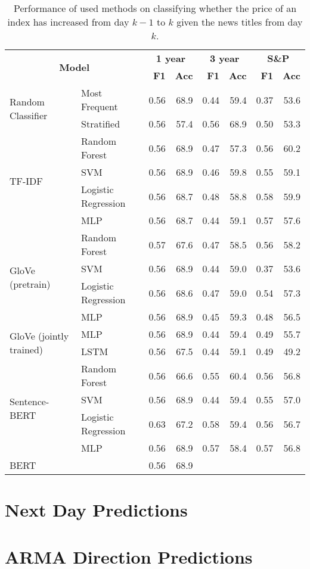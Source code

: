 \begin{table}[h]
    \centering
    \begin{tabular}{llrrrrrr}
    \hline
        \multicolumn{2}{c}{\multirow{2}{*}{\textbf{Model}}} & \multicolumn{2}{c}{\textbf{1 year}} & \multicolumn{2}{c}{\textbf{3 year}} & \multicolumn{2}{c}{\textbf{S\&P}} \\
      & & \textbf{F1} & \textbf{Acc} & \textbf{F1} & \textbf{Acc} & \textbf{F1} & \textbf{Acc} \\
        \hline \hline   
        \multirow{2}{*}{Random Classifier} & Most Frequent & 0.56 & 68.9 & 0.44 & 59.4 & 0.37 & 53.6 \\
        & Stratified & 0.56 & 57.4 & 0.56 & 68.9 & 0.50 & 53.3 \\
        \hline 
        \multirow{4}{*}{TF-IDF} & Random Forest & 0.56 & 68.9 & 0.47 & 57.3 & 0.56 & 60.2 \\
        & SVM & 0.56 & 68.9 & 0.46 & 59.8 & 0.55 & 59.1 \\
        & Logistic Regression & 0.56 & 68.7 & 0.48 & 58.8 & 0.58 & 59.9  \\
        & MLP & 0.56 & 68.7 & 0.44 & 59.1 & 0.57 & 57.6 \\
        \hline 
        \multirow{4}{*}{GloVe (pretrain)} & Random Forest & 0.57 & 67.6 & 0.47 & 58.5 & 0.56 & 58.2 \\
        & SVM & 0.56 & 68.9 & 0.44 & 59.0 & 0.37 & 53.6 \\
        & Logistic Regression & 0.56 & 68.6 & 0.47 & 59.0 & 0.54 & 57.3 \\
        & MLP & 0.56 & 68.9 & 0.45 & 59.3 & 0.48 & 56.5 \\
        \hline 
        \multirow{2}{*}{GloVe (jointly trained)} & MLP & 0.56 & 68.9 & 0.44 & 59.4 & 0.49 & 55.7 \\
        & LSTM & 0.56 & 67.5 & 0.44 & 59.1 & 0.49 & 49.2  \\
        \hline 
        \multirow{4}{*}{Sentence-BERT} & Random Forest & 0.56 & 66.6 & 0.55 & 60.4 & 0.56 & 56.8 \\
        & SVM & 0.56 & 68.9 & 0.44 & 59.4 & 0.55 & 57.0 \\
        & Logistic Regression & 0.63 & 67.2 & 0.58 & 59.4 & 0.56 & 56.7  \\
        & MLP & 0.56 & 68.9 & 0.57 & 58.4 & 0.57 & 56.8 \\
        \hline
        BERT & & 0.56 & 68.9 \\
        \hline
    \end{tabular}
\caption{Performance of used methods on classifying whether the price of an index has increased from day $k-1$ to $k$ given the news titles from day $k$.}
\label{tab:rescdp}
\end{table}

\section{Next Day Predictions}
\section{ARMA Direction Predictions}
